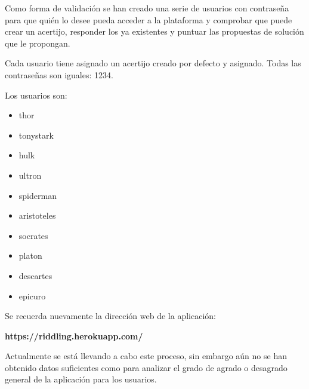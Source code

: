 Como forma de validación se han creado una serie de usuarios con contraseña para que quién lo desee pueda acceder a la plataforma y comprobar que puede crear un acertijo, responder los ya existentes y puntuar las propuestas de solución que le propongan.

Cada usuario tiene asignado un acertijo creado por defecto y asignado. Todas las contraseñas son iguales: 1234.

Los usuarios son:
\begin{itemize}
    \item thor
    \item tonystark
    \item hulk
    \item ultron
    \item spiderman
    \item aristoteles
    \item socrates
    \item platon
    \item descartes
    \item epicuro
\end{itemize}

Se recuerda nuevamente la dirección web de la aplicación:

\textbf{https://riddling.herokuapp.com/}

Actualmente se está llevando a cabo este proceso, sin embargo aún no se han obtenido datos suficientes como para analizar el grado de agrado o desagrado general de la aplicación para los usuarios. 